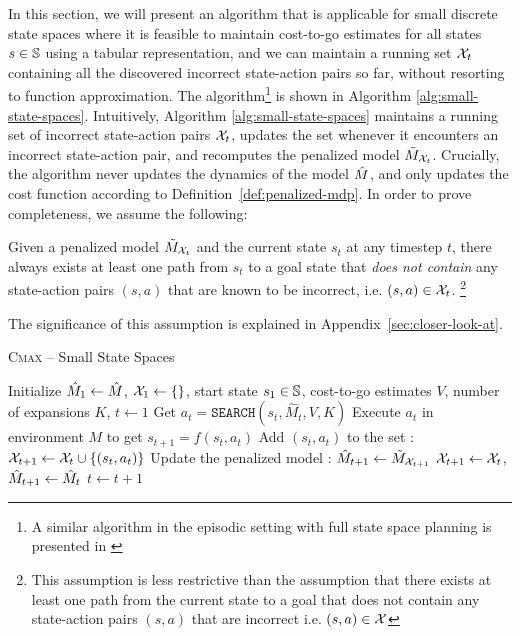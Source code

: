 In this section, we will present an algorithm that is applicable for
small discrete state spaces where it is feasible to maintain cost-to-go
estimates for all states $s \in \mathbb{S}$ using a tabular representation, and we can maintain a
running set $\mathcal{X}_t$ containing all the discovered incorrect state-action pairs
so far, without resorting to function approximation. The algorithm\footnote{A similar algorithm in the
  episodic setting with full state space planning is presented in \cite{DBLP:conf/aaai/Jiang18}} is shown in Algorithm
\ref{alg:small-state-spaces}.
Intuitively, Algorithm \ref{alg:small-state-spaces} maintains a
running set of incorrect state-action pairs
$\mathcal{X}_t$, updates the set whenever it encounters an incorrect
state-action pair, and recomputes the penalized model
$\tilde{M}_{\mathcal{X}_t}$. Crucially, the algorithm never updates the
dynamics of the model $\hat{M}$, and only updates the cost
function according to Definition~\ref{def:penalized-mdp}.
In order to prove completeness, we assume the following:
\begin{assumption}
  Given a penalized model $\tilde{M}_{\mathcal{X}_t}$ and the current
  state $s_t$ at any timestep $t$, there always exists at least one path from $s_t$ to a goal
  state that \textit{does not contain} any state-action pairs $(s, a)$ that are known to
  be incorrect, i.e. $(s, a) \in \mathcal{X}_t$. \footnote{This
    assumption is less restrictive than the assumption that
    there exists at least one path from the current state to a goal
    that does not contain any state-action pairs $(s, a)$ that are incorrect i.e. $(s,
    a) \in \mathcal{X}$}
  \label{assumption:core}
\end{assumption}

The significance of this assumption is explained in
Appendix~\ref{sec:closer-look-at}.

\begin{algorithm}[t]
  \caption{\textsc{Cmax} -- Small State Spaces}
  {\normalsize
  \begin{algorithmic}[1]
    \State Initialize $\hat{M}_1 \leftarrow \hat{M}$,
    $\mathcal{X}_1 \leftarrow \{\}$, start state $s_1 \in
    \mathbb{S}$, cost-to-go estimates $V$, number of expansions $K$,
    $t \leftarrow 1$
    \State Get $a_t = \mathtt{SEARCH}(s_t, \hat{M}_t, V, K)$
    \State Execute $a_t$ in environment $M$ to get $s_{t+1} = f(s_t, a_t)$
    \State Add $(s_t, a_t)$ to the set : $\mathcal{X}_{t+1} \leftarrow \mathcal{X}_t \cup
    \{(s_t, a_t)\}$
    \State Update the penalized model : $\hat{M}_{t+1} \leftarrow
    \tilde{M}_{\mathcal{X}_{t+1}}$
    \Else
    \State $\mathcal{X}_{t+1} \leftarrow \mathcal{X}_t$,
    $\hat{M}_{t+1} \leftarrow \hat{M}_t$
    \EndIf
    \State $t \leftarrow t + 1$
    \EndWhile
  \end{algorithmic}}
  \label{alg:small-state-spaces}
\end{algorithm}


